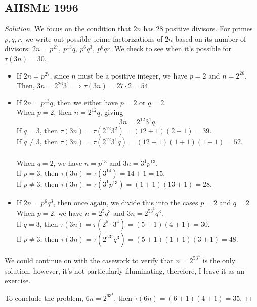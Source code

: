 \subsection{AHSME 1996}
\begin{proof}[Solution] We focus on the condition that $2n$ has $28$ positive divisors. For primes $p, q, r$, we write out possible prime factorizations of $2n$ based on its number of divisors: $2n= p^{27},\: p^{13}q,\: p^6q^3,\: p^6qr.$ We check to see when it's possible for $\tau(3n)=30$.

\begin{itemize} 
\item If $2n=p^{27}$, since $n$ must be a positive integer, we have $p=2$ and $n=2^{26}$. Then, $3n=2^{26}3^1\implies \tau(3n)=27\cdot 2=54.$ 

\item If $2n=p^{13}q$, then we either have $p=2$ or $q=2$.\\ \color{blue} When $p=2$\color{black}, then $n=2^{12}q$, giving $$3n=2^{12}3^1q.$$ If $q=3$, then $\tau(3n)=\tau(2^{12}3^2)=(12+1)(2+1)=39$. \\ If $q\neq 3$, then $\tau(3n)=\tau(2^{12}3^1q)=(12+1)(1+1)(1+1)=52.$ \\ \\ \color{blue} When $q=2$\color{black}, we have $n=p^{13}$ and $3n=3^1p^{13}$. \\ If $p=3$, then $\tau(3n)=\tau(3^{14})=14+1=15$. \\ If $p\neq 3$, then $\tau(3n)=\tau(3^1p^{13})=(1+1)(13+1)=28$. 
\clearpage

\item If $2n=p^6q^3$, then once again, we divide this into the cases $p=2$ and $q=2$. \\  \color{blue} When $p=2$\color{black}, we have $n=2^5q^3$ and $3n=2^53^1q^3$. \\
\color{ForestGreen} If $q=3$, then $\tau(3n)=\tau(2^5\cdot 3^4)=(5+1)(4+1)=30$. \\
\color{black} If $p\neq 3$, then $\tau(3n)=\tau(2^53^1q^3)=(5+1)(1+1)(3+1)=48$.
\end{itemize}
We could continue on with the casework to verify that $n=2^53^3$ is the only solution, however, it's not particularly illuminating, therefore, I leave it as an exercise.

To conclude the problem, $6n=2^63^4$, then $\tau(6n)=\left(6+1\right)\left(4+1\right)=\boxed{35}$. \end{proof}

\clearpage


